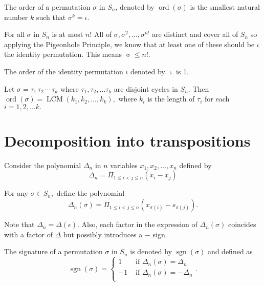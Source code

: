 
\begin{definition}
The order of a permutation $\sigma$ in $S_n$, denoted by $\operatorname{ord}(\sigma)$
is the smallest natural number $k$ such that $\sigma^k = \iota.$
\end{definition}

\begin{remark}
	For all $ \sigma$ in $S_n$ is at most $n!$ All of $ \sigma, \sigma^2, \dotsc, \sigma^{n!}$
	are distinct and cover all of $S_n$ so applying the Pigeonhole Principle, we know 
	that at least one of these should be $ \iota$ the identity permutation. This means
	$\operatorname{ \sigma} \leq n!.$ 
\end{remark}

\begin{remark}
	The order of the identity permutation $ \iota$ denoted by $\operatorname{ \iota} $
	is 1.
\end{remark}

\begin{corollary}
	Let $ \sigma = \tau_1 \, \tau_2 \, \cdots \, \tau_k$ where $ \tau_1, \tau_2, \dotsc
	\tau_k$ are disjoint cycles in $S_n.$ Then $\operatorname{ord}( \sigma) = 
	\operatorname{LCM}(k_1, k_2, \dotsc, k_k),$ where $k_i$ is the length of $ \tau_i$
	for each $i = 1, 2, \dotsc k.$
\end{corollary}

\section{Decomposition into transpositions}
Consider the polynomial $ \Delta_n$ in $n$ variables $x_1, x_2, \dotsc, x_n$ defined
by
$$ \Delta_n = \Pi _{1 \leq i < j \leq n} (x_i - x_j) $$

For any $ \sigma \in S_n,$ define the polynomial
$$ \Delta_n( \sigma) = \Pi _{1 \leq i < j \leq n} ( x _{\sigma(i) } - s _{ \sigma(j)} ). $$

Note that $ \Delta_n = \Delta( \epsilon) .$
Also, each factor in the expression of $ \Delta_n( \sigma) $ coincides with a factor of
$ \Delta $ but possibly introduces a $-$ sign.

\begin{definition}
	The signature of a permutation $ \sigma$ in $S_n$ is denoted by $\operatorname{sgn}
	( \sigma)$ and defined as
	$$ \operatorname{sgn}( \sigma) = \begin{cases}
	1 & \text{ if } \Delta_n(\sigma) = \Delta_n \\
	-1 & \text{ if } \Delta_n( \sigma) = - \Delta_n \\
	\end{cases}. $$
\end{definition}

